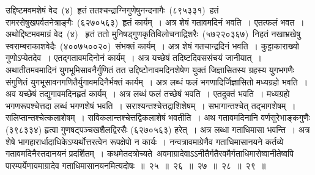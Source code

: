 \documentclass[11pt, openany]{book}
\begin{document}
\indent
उद्दिष्टमवमशेषं वेद~(४)~हृतं ततश्चन्द्राग्निगुणेषुनन्दनागैः~(८९५३३१)~हतं रामरसेषुखपर्वतनेत्राङ्गैः~(६२७०५६३)~हृतं कार्यम्~। अत्र शेषं गतावमदिनं भवति~। एतत्फलं भवत~। अथोद्दिष्टमवमाग्रं वेद~(४)~ हृतं ततो मुनिषड्गुणकृतिविलोचनाद्रिशरैः~(५७२२०३६७)~निहतं नखाभ्रखेषु स्वराम्बराकाशवेदैः~(४००७५००२०)~संभक्तं कार्यम्~। अत्र शेषं गतचान्द्रदिनं भवति~। कुट्टाकाराख्यो गुणोऽप्येतदेव~। एतद्गतावमदिनोनं कार्यम्~। अत्र यच्छेषं तदिष्टदिवससंचयं जानीयात्~। अथातीतमवमादिनं युगभूमिसावनैर्गुणितं तत उद्दिष्टोनावमदिनशेषेण युक्तं जिज्ञासितस्य ग्रहस्य युगभगणैः
संगुणितं युगभूसावनगणितैर्युगावमदिनैर्भक्तं कार्यम्~। अत्र लब्धं फलं भगणादिर्जिज्ञासितो मध्यग्रहो भवति~। अव यच्छेषं तद्युगावमदिनहृतं कार्यम्~। अत्र लब्धं फलं तच्छेषं भवति~। एतदुक्तं भवति~। मध्यग्रहो भगणरूपश्चेत्तदा लब्धं भगणशेषं भवति~। सराश्यन्तश्चेत्तद्राशिशेषम्~। सभागान्तश्चेत् तद्भागशेषम्~। सलिप्तान्तश्चेत्कलाशेषम्~। सविकलान्तश्चेत्तद्विकलाशेषं भवतीति~। अथ गतावमदिनानि वर्णसुरेभाङ्कगुणैः (३९८३३४) हृत्वा गुणषट्पञ्चखशैलद्विरसैः (६२७०५६३) हरेत्~। अत्र लब्धा गताधिमासा
भवन्ति~। अत्र शेषे भागहारार्धादाधिकेऽप्यर्थोत्तरत्वेन रूपक्षेपो न कार्यः~। नन्वत्रावमाग्रेणैव गताधिमासानयने कर्तव्ये गतावमदिनैस्तदानयनं प्रदर्शितम्~।
कथमेतदत्रोच्यते\textendash\ अवमाग्रादेवाऽऽनीतैर्गतैरवमैर्गताधिमासेष्वानीतेष्वपि पारम्पर्येणावमाग्रादेव गताधिमासानयनमित्यदोषः~॥~२५~॥~२६~॥~२७~॥~२८~॥~२९~॥
\end{document}
